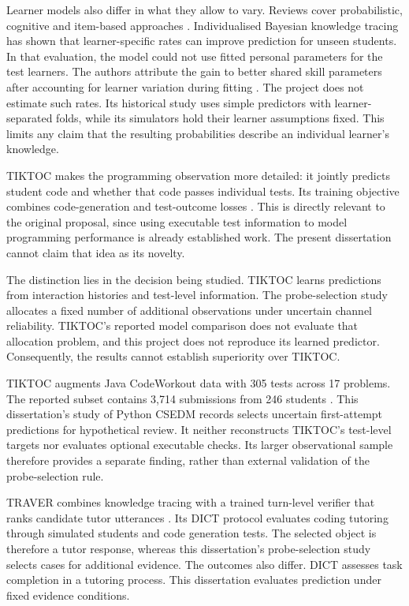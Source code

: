 Learner models also differ in what they allow to vary. Reviews cover probabilistic, cognitive and item-based approaches
\parencite{desmarais2012learner}. Individualised Bayesian knowledge tracing has shown that learner-specific rates can improve
prediction for unseen students. In that evaluation, the model could not use fitted personal parameters for the test learners.
The authors attribute the gain to better shared skill parameters after accounting for learner variation during fitting
\parencite[Section 4]{yudelson2013individualized}. The project does not estimate such rates. Its historical
study uses simple predictors with learner-separated folds, while its simulators hold their learner assumptions fixed. This
limits any claim that the resulting probabilities describe an individual learner's knowledge.

TIKTOC makes the programming observation more detailed: it jointly predicts student code and whether that code passes
individual tests. Its training objective combines code-generation and test-outcome losses
\parencite[Section 4.3, equation 4]{duan2025tiktoc}. This is directly relevant to the original proposal, since using executable
test information to model programming performance is already established work. The present dissertation cannot claim that
idea as its novelty.

The distinction lies in the decision being studied. TIKTOC learns predictions from interaction histories and test-level
information. The probe-selection study allocates a fixed number of additional observations under uncertain channel reliability. TIKTOC's reported
model comparison does not evaluate that allocation problem, and this project does not reproduce its learned predictor.
Consequently, the results cannot establish superiority over TIKTOC.

TIKTOC augments Java CodeWorkout data with 305 tests across 17 problems. The reported
subset contains 3,714 submissions from 246 students \parencite[Section 3.2, Table 2]{duan2025tiktoc}. This dissertation's study of
Python CSEDM records selects uncertain first-attempt predictions for hypothetical review. It neither reconstructs
TIKTOC's test-level targets nor evaluates optional executable checks. Its larger observational sample therefore provides a
separate finding, rather than external validation of the probe-selection rule.

TRAVER combines knowledge tracing with a trained turn-level verifier that ranks candidate tutor utterances
\parencite[Sections 3.1--3.2]{wang2025traver}. Its DICT protocol evaluates coding tutoring through simulated students and code
generation tests. The selected object is therefore a tutor response, whereas this dissertation's probe-selection study selects cases for additional evidence.
The outcomes also differ. DICT assesses task completion in a tutoring process. This dissertation evaluates prediction under
fixed evidence conditions.

